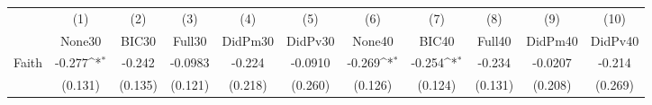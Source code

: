 {
\def\sym#1{\ifmmode^{#1}\else\(^{#1}\)\fi}
\begin{tabular}{l*{10}{c}}
\toprule
            &\multicolumn{1}{c}{(1)}&\multicolumn{1}{c}{(2)}&\multicolumn{1}{c}{(3)}&\multicolumn{1}{c}{(4)}&\multicolumn{1}{c}{(5)}&\multicolumn{1}{c}{(6)}&\multicolumn{1}{c}{(7)}&\multicolumn{1}{c}{(8)}&\multicolumn{1}{c}{(9)}&\multicolumn{1}{c}{(10)}\\
            &\multicolumn{1}{c}{None30}&\multicolumn{1}{c}{BIC30}&\multicolumn{1}{c}{Full30}&\multicolumn{1}{c}{DidPm30}&\multicolumn{1}{c}{DidPv30}&\multicolumn{1}{c}{None40}&\multicolumn{1}{c}{BIC40}&\multicolumn{1}{c}{Full40}&\multicolumn{1}{c}{DidPm40}&\multicolumn{1}{c}{DidPv40}\\
\midrule
Faith       &      -0.277\sym{*}  &      -0.242         &     -0.0983         &      -0.224         &     -0.0910         &      -0.269\sym{*}  &      -0.254\sym{*}  &      -0.234         &     -0.0207         &      -0.214         \\
            &     (0.131)         &     (0.135)         &     (0.121)         &     (0.218)         &     (0.260)         &     (0.126)         &     (0.124)         &     (0.131)         &     (0.208)         &     (0.269)         \\
\bottomrule
\end{tabular}
}
